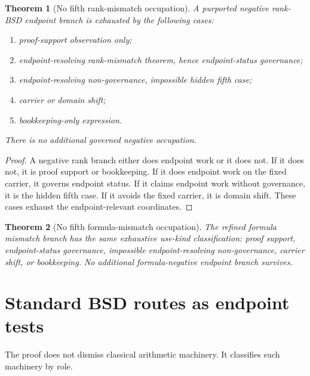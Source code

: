 \documentclass[11pt]{article}
\newtheorem{theorem}{Theorem}[section]
\begin{document}
\begin{theorem}[No fifth rank-mismatch occupation]
A purported negative rank-BSD endpoint branch is exhausted by the following cases:
\begin{enumerate}[label=(\roman*)]
\item proof-support observation only;
\item endpoint-resolving rank-mismatch theorem, hence endpoint-status governance;
\item endpoint-resolving non-governance, impossible hidden fifth case;
\item carrier or domain shift;
\item bookkeeping-only expression.
\end{enumerate}
There is no additional governed negative occupation.
\end{theorem}

\begin{proof}
A negative rank branch either does endpoint work or it does not. If it does not, it is proof support or bookkeeping. If it does endpoint work on the fixed carrier, it governs endpoint status. If it claims endpoint work without governance, it is the hidden fifth case. If it avoids the fixed carrier, it is domain shift. These cases exhaust the endpoint-relevant coordinates.
\end{proof}

\begin{theorem}[No fifth formula-mismatch occupation]
The refined formula mismatch branch has the same exhaustive use-kind classification: proof support, endpoint-status governance, impossible endpoint-resolving non-governance, carrier shift, or bookkeeping. No additional formula-negative endpoint branch survives.
\end{theorem}

\section{Standard BSD routes as endpoint tests}

The proof does not dismiss classical arithmetic machinery. It classifies such machinery by role.
\end{document}
